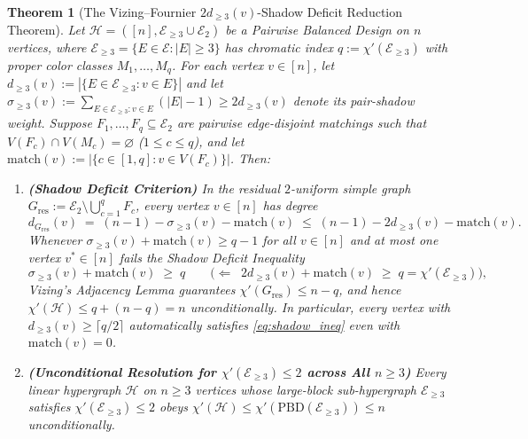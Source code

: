 \documentclass[11pt,reqno]{amsart}
\newtheorem{theorem}{Theorem}[section]
\theoremstyle{definition}
\theoremstyle{remark}
\begin{document}
\begin{theorem}[The Vizing--Fournier $2 d_{\ge 3}(v)$-Shadow Deficit Reduction Theorem]\label{thm:vizing_fournier_shadow}
Let $\mathcal{H} = ([n], \mathcal{E}_{\ge 3} \cup \mathcal{E}_2)$ be a Pairwise Balanced Design on $n$ vertices, where $\mathcal{E}_{\ge 3} = \{E \in \mathcal{E} : |E| \ge 3\}$ has chromatic index $q := \chi'(\mathcal{E}_{\ge 3})$ with proper color classes $M_1, \dots, M_q$. For each vertex $v \in [n]$, let $d_{\ge 3}(v) := |\{E \in \mathcal{E}_{\ge 3} : v \in E\}|$ and let $\sigma_{\ge 3}(v) := \sum_{E \in \mathcal{E}_{\ge 3} : v \in E} (|E| - 1) \ge 2 d_{\ge 3}(v)$ denote its pair-shadow weight. Suppose $F_1, \dots, F_q \subseteq \mathcal{E}_2$ are pairwise edge-disjoint matchings such that $V(F_c) \cap V(M_c) = \varnothing$ ($1 \le c \le q$), and let $\mathrm{match}(v) := |\{c \in [1, q] : v \in V(F_c)\}|$. Then:
\begin{enumerate}
  \item[\textup{(a)}] \textbf{(Shadow Deficit Criterion)} In the residual $2$-uniform simple graph $G_{\mathrm{res}} := \mathcal{E}_2 \setminus \bigcup_{c=1}^q F_c$, every vertex $v \in [n]$ has degree
  \begin{equation}\label{eq:res_deg}
    d_{G_{\mathrm{res}}}(v) \;=\; (n - 1) - \sigma_{\ge 3}(v) - \mathrm{match}(v) \;\le\; (n - 1) - 2 d_{\ge 3}(v) - \mathrm{match}(v).
  \end{equation}
  Whenever $\sigma_{\ge 3}(v) + \mathrm{match}(v) \ge q - 1$ for all $v \in [n]$ and at most one vertex $v^* \in [n]$ fails the \emph{Shadow Deficit Inequality}
  \begin{equation}\label{eq:shadow_ineq}
    \sigma_{\ge 3}(v) + \mathrm{match}(v) \;\ge\; q \qquad \bigl(\Longleftarrow\;\; 2 d_{\ge 3}(v) + \mathrm{match}(v) \;\ge\; q = \chi'(\mathcal{E}_{\ge 3})\bigr),
  \end{equation}
  Vizing's Adjacency Lemma guarantees $\chi'(G_{\mathrm{res}}) \le n - q$, and hence $\chi'(\mathcal{H}) \le q + (n - q) = n$ unconditionally. In particular, every vertex with $d_{\ge 3}(v) \ge \lceil q / 2 \rceil$ automatically satisfies \eqref{eq:shadow_ineq} even with $\mathrm{match}(v) = 0$.
  \item[\textup{(b)}] \textbf{(Unconditional Resolution for $\chi'(\mathcal{E}_{\ge 3}) \le 2$ across All $n \ge 3$)} Every linear hypergraph $\mathcal{H}$ on $n \ge 3$ vertices whose large-block sub-hypergraph $\mathcal{E}_{\ge 3}$ satisfies $\chi'(\mathcal{E}_{\ge 3}) \le 2$ obeys $\chi'(\mathcal{H}) \le \chi'(\mathrm{PBD}(\mathcal{E}_{\ge 3})) \le n$ unconditionally.

\end{enumerate}
\end{theorem}
\end{document}
